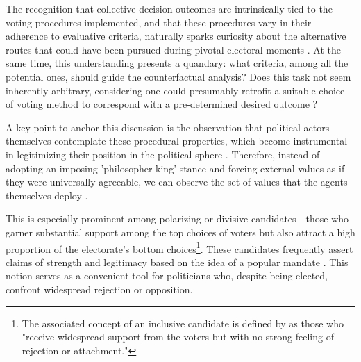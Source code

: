 \documentclass[hidelinks,11pt]{article} \usepackage[utf8]{inputenc}
\begin{document}
The recognition that collective decision outcomes are intrinsically tied to the
voting procedures implemented, and that these procedures vary in their adherence
to evaluative criteria, naturally sparks curiosity about the alternative routes
that could have been pursued during pivotal electoral moments
\parencite{tabarrok1999would, kaminski1999communism, ostrom1986agenda}. At the
same time, this understanding presents a quandary: what criteria, among all the
potential ones, should guide the counterfactual analysis? Does this task not
seem inherently arbitrary, considering one could presumably retrofit a suitable
choice of voting method to correspond with a pre-determined desired outcome
\parencite{riker1982liberalism}?

A key point to anchor this discussion is the observation that political actors
themselves contemplate these procedural properties, which become instrumental in
legitimizing their position in the political sphere
\parencite{mclean02_william_h, ostrom2009understanding}. Therefore, instead of
adopting an imposing 'philosopher-king' stance and forcing external values as if
they were universally agreeable, we can observe the set of values that the
agents themselves deploy \parencite{binmore2005natural}.

This is especially prominent among polarizing or divisive candidates - those who
garner substantial support among the top choices of voters but also attract a
high proportion of the electorate's bottom choices\footnote{The associated concept of an inclusive candidate is defined by \textcite[p.6]{igersheim22_compar_votin_method} as those who "receive widespread support from the voters but with no strong feeling of rejection or attachment."}. These candidates
frequently assert claims of strength and legitimacy based on the idea of a
popular mandate \parencite{tabarrok2001president}. This notion serves as a
convenient tool for politicians who, despite being elected, confront widespread
rejection or opposition.



\end{document}
